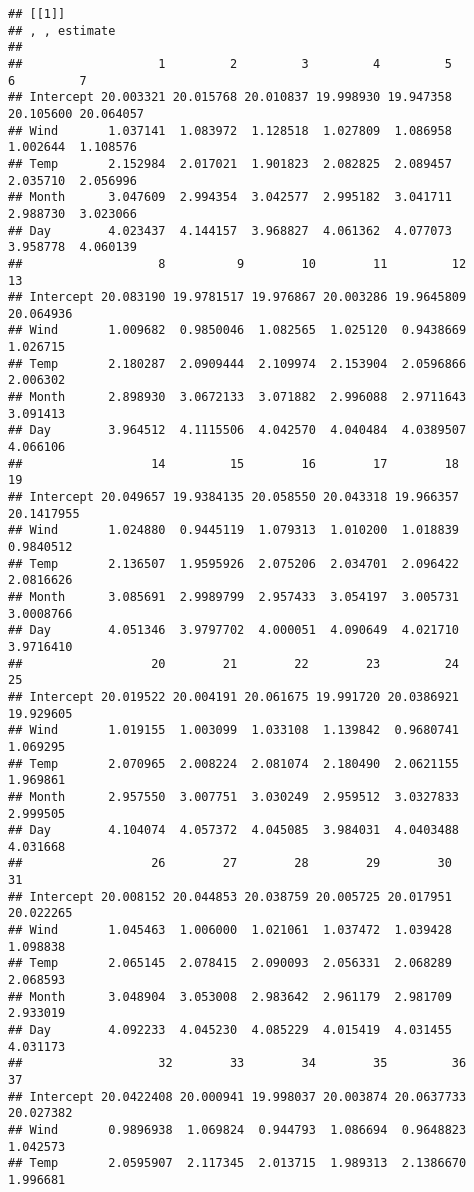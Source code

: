 \documentclass[
]{article}
\begin{document}
\begin{verbatim}
## [[1]]
## , , estimate
## 
##                   1         2         3         4         5         6         7
## Intercept 20.003321 20.015768 20.010837 19.998930 19.947358 20.105600 20.064057
## Wind       1.037141  1.083972  1.128518  1.027809  1.086958  1.002644  1.108576
## Temp       2.152984  2.017021  1.901823  2.082825  2.089457  2.035710  2.056996
## Month      3.047609  2.994354  3.042577  2.995182  3.041711  2.988730  3.023066
## Day        4.023437  4.144157  3.968827  4.061362  4.077073  3.958778  4.060139
##                   8          9        10        11         12        13
## Intercept 20.083190 19.9781517 19.976867 20.003286 19.9645809 20.064936
## Wind       1.009682  0.9850046  1.082565  1.025120  0.9438669  1.026715
## Temp       2.180287  2.0909444  2.109974  2.153904  2.0596866  2.006302
## Month      2.898930  3.0672133  3.071882  2.996088  2.9711643  3.091413
## Day        3.964512  4.1115506  4.042570  4.040484  4.0389507  4.066106
##                  14         15        16        17        18         19
## Intercept 20.049657 19.9384135 20.058550 20.043318 19.966357 20.1417955
## Wind       1.024880  0.9445119  1.079313  1.010200  1.018839  0.9840512
## Temp       2.136507  1.9595926  2.075206  2.034701  2.096422  2.0816626
## Month      3.085691  2.9989799  2.957433  3.054197  3.005731  3.0008766
## Day        4.051346  3.9797702  4.000051  4.090649  4.021710  3.9716410
##                  20        21        22        23         24        25
## Intercept 20.019522 20.004191 20.061675 19.991720 20.0386921 19.929605
## Wind       1.019155  1.003099  1.033108  1.139842  0.9680741  1.069295
## Temp       2.070965  2.008224  2.081074  2.180490  2.0621155  1.969861
## Month      2.957550  3.007751  3.030249  2.959512  3.0327833  2.999505
## Day        4.104074  4.057372  4.045085  3.984031  4.0403488  4.031668
##                  26        27        28        29        30        31
## Intercept 20.008152 20.044853 20.038759 20.005725 20.017951 20.022265
## Wind       1.045463  1.006000  1.021061  1.037472  1.039428  1.098838
## Temp       2.065145  2.078415  2.090093  2.056331  2.068289  2.068593
## Month      3.048904  3.053008  2.983642  2.961179  2.981709  2.933019
## Day        4.092233  4.045230  4.085229  4.015419  4.031455  4.031173
##                   32        33        34        35         36        37
## Intercept 20.0422408 20.000941 19.998037 20.003874 20.0637733 20.027382
## Wind       0.9896938  1.069824  0.944793  1.086694  0.9648823  1.042573
## Temp       2.0595907  2.117345  2.013715  1.989313  2.1386670  1.996681

\end{verbatim}
\end{document}
